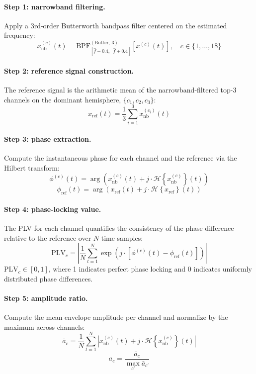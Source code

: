\paragraph{Step 1: narrowband filtering.}
Apply a 3rd-order Butterworth bandpass filter centered on the estimated frequency:
\[ x_{\mathrm{nb}}^{(c)}(t) = \mathrm{BPF}_{[\hat{f} - 0.4,\;\; \hat{f} + 0.4]}^{(\mathrm{Butter},\, 3)}\!\left[x^{(c)}(t)\right], \quad c \in \{1,\ldots,18\} \tag{1} \]

\paragraph{Step 2: reference signal construction.}
The reference signal is the arithmetic mean of the narrowband-filtered top-3 channels on the dominant hemisphere, $\{c_1, c_2, c_3\}$:
\[ x_{\mathrm{ref}}(t) = \frac{1}{3} \sum_{i=1}^{3} x_{\mathrm{nb}}^{(c_i)}(t) \tag{2} \]

\paragraph{Step 3: phase extraction.}
Compute the instantaneous phase for each channel and the reference via the Hilbert transform:
\[ \phi^{(c)}(t) = \arg\!\left(x_{\mathrm{nb}}^{(c)}(t) + j \cdot \mathcal{H}\!\left\{x_{\mathrm{nb}}^{(c)}\right\}(t)\right) \tag{3} \]
\[ \phi_{\mathrm{ref}}(t) = \arg\!\left(x_{\mathrm{ref}}(t) + j \cdot \mathcal{H}\!\left\{x_{\mathrm{ref}}\right\}(t)\right) \tag{4} \]

\paragraph{Step 4: phase-locking value.}
The PLV for each channel quantifies the consistency of the phase difference relative to the reference over $N$ time samples:
\[ \mathrm{PLV}_c = \left|\frac{1}{N} \sum_{t=1}^{N} \exp\!\left(j \cdot \left[\phi^{(c)}(t) - \phi_{\mathrm{ref}}(t)\right]\right)\right| \tag{5} \]
$\mathrm{PLV}_c \in [0,1]$, where 1 indicates perfect phase locking and 0 indicates uniformly distributed phase differences.

\paragraph{Step 5: amplitude ratio.}
Compute the mean envelope amplitude per channel and normalize by the maximum across channels:
\[ \bar{a}_c = \frac{1}{N} \sum_{t=1}^{N} \left|x_{\mathrm{nb}}^{(c)}(t) + j \cdot \mathcal{H}\!\left\{x_{\mathrm{nb}}^{(c)}\right\}(t)\right| \tag{6} \]
\[ a_c = \frac{\bar{a}_c}{\max_{c'} \bar{a}_{c'}} \tag{7} \]

